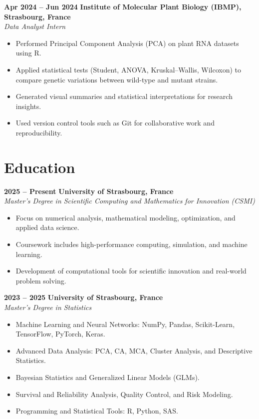 \documentclass[lighthipster]{simplehipstercv}
\begin{document}
\begin{paracol}{2}
\textbf{Apr 2024 -- Jun 2024} \hfill \textbf{Institute of Molecular Plant Biology (IBMP), Strasbourg, France}\\
\textit{Data Analyst Intern}
\begin{itemize}[leftmargin=2em, itemsep=0.2em, topsep=0em]
    \item Performed Principal Component Analysis (PCA) on plant RNA datasets using R.
    \item Applied statistical tests (Student, ANOVA, Kruskal–Wallis, Wilcoxon) to compare genetic variations between wild-type and mutant strains.
    \item Generated visual summaries and statistical interpretations for research insights.
    \item Used version control tools such as Git for collaborative work and reproducibility.
\end{itemize}

\vspace{-1em}


\section*{Education}

\textbf{2025 -- Present} \hfill \textbf{University of Strasbourg, France}\\
\textit{Master’s Degree in Scientific Computing and Mathematics for Innovation (CSMI)}
\begin{itemize}[leftmargin=2em, itemsep=0.2em, topsep=0em]
    \item Focus on numerical analysis, mathematical modeling, optimization, and applied data science.
    \item Coursework includes high-performance computing, simulation, and machine learning.
    \item Development of computational tools for scientific innovation and real-world problem solving.
\end{itemize}

\textbf{2023 -- 2025} \hfill \textbf{University of Strasbourg, France}\\
\textit{Master’s Degree in Statistics}
\begin{itemize}[leftmargin=2em, itemsep=0.2em, topsep=0em]
    \item Machine Learning and Neural Networks: NumPy, Pandas, Scikit-Learn, TensorFlow, PyTorch, Keras.
    \item Advanced Data Analysis: PCA, CA, MCA, Cluster Analysis, and Descriptive Statistics.
    \item Bayesian Statistics and Generalized Linear Models (GLMs).
    \item Survival and Reliability Analysis, Quality Control, and Risk Modeling.
    \item Programming and Statistical Tools: R, Python, SAS.
\end{itemize}


\end{paracol}
\end{document}
